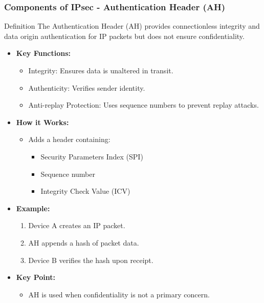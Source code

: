 \documentclass{beamer}
\begin{document}
\begin{frame}[fragile]
    \frametitle{Components of IPsec - Authentication Header (AH)}
    \begin{block}{Definition}
        The Authentication Header (AH) provides connectionless integrity and data origin authentication for IP packets but does not ensure confidentiality.
    \end{block}
    \begin{itemize}
        \item \textbf{Key Functions:}
            \begin{itemize}
                \item Integrity: Ensures data is unaltered in transit.
                \item Authenticity: Verifies sender identity.
                \item Anti-replay Protection: Uses sequence numbers to prevent replay attacks.
            \end{itemize}
        \item \textbf{How it Works:}
            \begin{itemize}
                \item Adds a header containing:
                    \begin{itemize}
                        \item Security Parameters Index (SPI)
                        \item Sequence number
                        \item Integrity Check Value (ICV)
                    \end{itemize}
            \end{itemize}
        \item \textbf{Example:}
            \begin{enumerate}
                \item Device A creates an IP packet.
                \item AH appends a hash of packet data.
                \item Device B verifies the hash upon receipt.
            \end{enumerate}
        \item \textbf{Key Point:} 
            \begin{itemize}
                \item AH is used when confidentiality is not a primary concern.
            \end{itemize}
    \end{itemize}
\end{frame}
\end{document}
